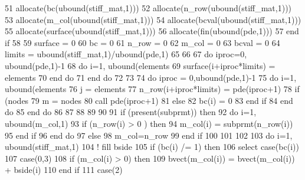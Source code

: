 \begin{DoxyCode}
51       \textcolor{keyword}{allocate}(bc(ubound(stiff_mat,1)))
52       \textcolor{keyword}{allocate}(n\_row(ubound(stiff_mat,1)))
53       \textcolor{keyword}{allocate}(m\_col(ubound(stiff_mat,1)))
54       \textcolor{keyword}{allocate}(bcval(ubound(stiff_mat,1)))
55       \textcolor{keyword}{allocate}(surface(ubound(stiff_mat,1)))
56       \textcolor{keyword}{allocate}(fin(ubound(pde,1)))
57 \textcolor{keywordflow}{    end if}
58     
59     surface = 0
60     bc = 0
61     n\_row = 0
62     m\_col = 0
63     bcval = 0
64     limits = ubound(stiff_mat,1)/ubound(pde,1)
65         
66 
67     \textcolor{keywordflow}{do} iproc=0, ubound(pde,1)-1
68       \textcolor{keywordflow}{do} i=1, ubound(elements%
69         surface(i+iproc*limits) = elements%
70 \textcolor{keywordflow}{      end do}
71 \textcolor{keywordflow}{    end do}
72     
73     
74     \textcolor{keywordflow}{do} iproc = 0,ubound(pde,1)-1
75       \textcolor{keywordflow}{do} i=1, ubound(elements%
76         j = elements%
77         n\_row(i+iproc*limits) = pde(iproc+1)%
78         \textcolor{keywordflow}{if} (nodes%
79           m = nodes%
80           \textcolor{keyword}{call }pde(iproc+1)%
81         \textcolor{keywordflow}{else}
82           bc(i) = 0
83 \textcolor{keywordflow}{        end if}
84 \textcolor{keywordflow}{      end do}
85 \textcolor{keywordflow}{    end do}
86     
87     
88 
89     
90 
91     \textcolor{keywordflow}{if} (\textcolor{keyword}{present}(subprmt)) \textcolor{keywordflow}{then}
92       \textcolor{keywordflow}{do} i=1, ubound(m\_col,1)
93         \textcolor{keywordflow}{if} (n\_row(i) > 0 ) \textcolor{keywordflow}{then}
94           m\_col(i) = subprmt(n\_row(i))
95 \textcolor{keywordflow}{        end if}
96 \textcolor{keywordflow}{      end do}
97     \textcolor{keywordflow}{else}
98       m\_col=n\_row
99 \textcolor{keywordflow}{    end if}
100 
101  
102 
103     \textcolor{keywordflow}{do} i=1, ubound(stiff_mat,1)
104       \textcolor{comment}{! fill bside}
105       \textcolor{keywordflow}{if} (bc(i) /= 1) \textcolor{keywordflow}{then}
106         \textcolor{keywordflow}{select case}(bc(i))
107           \textcolor{keywordflow}{case}(0,3)
108               \textcolor{keywordflow}{if} (m\_col(i) > 0) \textcolor{keywordflow}{then}
109                 bvect(m\_col(i)) = bvect(m\_col(i)) + bside(i)
110 \textcolor{keywordflow}{              end if}
111           \textcolor{keywordflow}{case}(2)

\end{DoxyCode}

